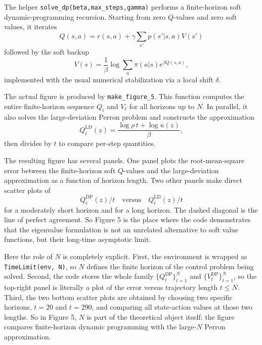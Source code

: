 \documentclass[11pt]{article}
\begin{document}
The helper \texttt{solve\_dp(beta,max\_steps,gamma)} performs a finite-horizon soft
dynamic-programming recursion. Starting from zero \(Q\)-values and zero soft values, it
iterates
\begin{equation}
    Q(s,a) = r(s,a) + \gamma \sum_{s'} p(s'|s,a) V(s')
\end{equation}
followed by the soft backup
\begin{equation}
    V(s)=\frac{1}{\beta}\log \sum_a \pi(a|s)e^{\beta Q(s,a)},
\end{equation}
implemented with the usual numerical stabilization via a local shift \(\delta\).

The actual figure is produced by \texttt{make\_figure\_5}. This function computes the entire
finite-horizon sequence \(Q_t\) and \(V_t\) for all horizons up to \(N\). In parallel, it also
solves the large-deviation Perron problem and constructs the approximation
\begin{equation}
    Q^{\mathrm{LD}}_t(z)
    =
    \frac{\log \rho \, t + \log u(z)}{\beta},
\end{equation}
then divides by \(t\) to compare per-step quantities.

The resulting figure has several panels. One panel plots the root-mean-square error between the
finite-horizon soft \(Q\)-values and the large-deviation approximation as a function of horizon
length. Two other panels make direct scatter plots of
\begin{equation}
    Q^{\mathrm{DP}}_t(z)/t
    \quad \text{versus} \quad
    Q^{\mathrm{LD}}_t(z)/t
\end{equation}
for a moderately short horizon and for a long horizon. The dashed diagonal is the line of
perfect agreement. So Figure 5 is the place where the code demonstrates that the eigenvalue
formulation is not an unrelated alternative to soft value functions, but their long-time
asymptotic limit.

Here the role of \(N\) is completely explicit. First, the environment is wrapped as
\texttt{TimeLimit(env, N)}, so \(N\) defines the finite horizon of the control problem being
solved. Second, the code stores the whole family
\(\{Q_t^{\mathrm{DP}}\}_{t=1}^N\) and \(\{V_t^{\mathrm{DP}}\}_{t=1}^N\), so the top-right
panel is literally a plot of the error versus trajectory length \(t\le N\). Third, the two
bottom scatter plots are obtained by choosing two specific horizons, \(t=20\) and \(t=290\),
and comparing all state-action values at those two lengths. So in Figure 5, \(N\) is part of
the theoretical object itself: the figure compares finite-horizon dynamic programming with the
large-\(N\) Perron approximation.
\end{document}

